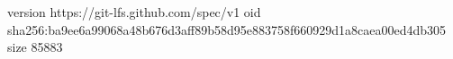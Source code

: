 version https://git-lfs.github.com/spec/v1
oid sha256:ba9ee6a99068a48b676d3aff89b58d95e883758f660929d1a8caea00ed4db305
size 85883
